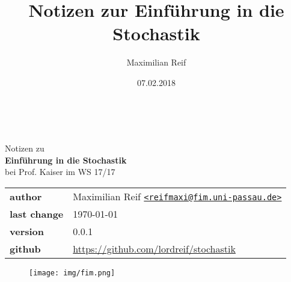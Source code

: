 \documentclass[11pt,a4paper,ngerman]{article}
\date{07.02.2018}
\author{Maximilian Reif}
\title{Notizen zur Einführung in die Stochastik}
\begin{document}
\begin{titlepage}
    \ \newline\newline\newline\newline\newline
	
	\begin{center}

		\huge Notizen zu\\
		\Huge\textbf{Einführung in die Stochastik}\\
		\huge bei Prof. Kaiser im WS 17/17\\
		\normalsize

		\vspace{1cm}
		\begin{tabular}[b]{l|l}
			\textbf{author} 		& Maximilian Reif
			\texttt{\href{mailto:reifmaxi@fim.uni-passau.de}
			{<reifmaxi@fim.uni-passau.de>}}\\
			\textbf{last change}	& \today \\
			\textbf{version} 	& 0.0.1\\
			\textbf{github} 		& \url{https://github.com/lordreif/stochastik}
		\end{tabular}
		\vspace{1cm}
		
	\end{center}
	
	\begin{figure}[b]
	\centering
	\texttt{[image: img/fim.png]}
	\end{figure}
	
\end{titlepage}

%

\newpage
\newpage

\setcounter{page}{1}

%

%
%
%
\end{document}
